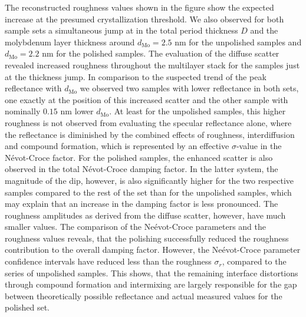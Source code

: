 The reconstructed roughness values shown in the figure show the expected increase at the presumed crystallization threshold. We also observed for both sample sets a simultaneous jump at in the total period thickness $D$ and the molybdenum layer thickness around $d_\text{Mo} = 2.5$ nm for the unpolished samples and $d_\text{Mo} = 2.2$ nm for the polished samples. The evaluation of the diffuse scatter revealed increased roughness throughout the multilayer stack for the samples just at the thickness jump. In comparison to the suspected trend of the peak reflectance with $d_\text{Mo}$ we observed two samples with lower reflectance in both sets, one exactly at the position of this increased scatter and the other sample with nominally $0.15$ nm lower $d_\text{Mo}$. At least for the unpolished samples, this higher roughness is not observed from evaluating the specular reflectance alone, where the reflectance is diminished by the combined effects of roughness, interdiffusion and compound formation, which is represented by an effective $\sigma$-value in the N\'{e}vot-Croce factor. For the polished samples, the enhanced scatter is also observed in the total N\'{e}vot-Croce damping factor. In the latter system, the magnitude of the dip, however, is also significantly higher for the two respective samples compared to the rest of the set than for the unpolished samples, which may explain that an increase in the damping factor is less pronounced. The roughness amplitudes as derived from the diffuse scatter, however, have much smaller values. The comparison of the Ne\'{e}vot-Croce parameters and the roughness values reveals, that the polishing successfully reduced the roughness contribution to the overall damping factor. However, the Ne\'{e}vot-Croce parameter confidence intervals have reduced less than the roughness $\sigma_r$, compared to the series of unpolished samples. This shows, that the remaining interface distortions through compound formation and intermixing are largely responsible for the gap between theoretically possible reflectance and actual measured values for the polished set.

